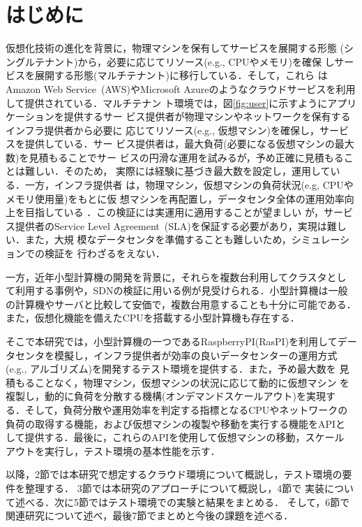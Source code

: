 \documentclass[submit,techrep]{ipsj}
\begin{document}
\section{はじめに}
仮想化技術の進化を背景に，物理マシンを保有してサービスを展開する形態
(シングルテナント)から，必要に応じてリソース(e.g., CPUやメモリ)を確保
しサービスを展開する形態(マルチテナント)に移行している．そして，これら
はAmazon Web Service~(AWS)\cite{aws}やMicrosoft Azure\cite{azure}のようなクラウドサービスを利用して提供されている．マルチテナン
ト環境では，図\ref{fig:user}に示すようにアプリケーションを提供するサー
ビス提供者が物理マシンやネットワークを保有するインフラ提供者から必要に
応じてリソース(e.g., 仮想マシン)を確保し，サービスを提供している．サー
ビス提供者は，最大負荷(必要になる仮想マシンの最大数)を見積もることでサー
ビスの円滑な運用を試みるが，予め正確に見積もることは難しい．そのため，
実際には経験に基づき最大数を設定し，運用している．一方，インフラ提供者
は，物理マシン，仮想マシンの負荷状況(e.g, CPUやメモリ使用量)をもとに仮
想マシンを再配置し，データセンタ全体の運用効率向上を目指している
\cite{cloud1}\cite{cloud2}．この検証には実運用に適用することが望ましい
が，サービス提供者のService Level Agreement~(SLA)を保証する必要があり，実現は難しい．また，大規
模なデータセンタを準備することも難しいため，シミュレーションでの検証を
行わざるをえない\cite{testbed}．

一方，近年小型計算機の開発を背景に，それらを複数台利用してクラスタとし
て利用する事例や，SDNの検証に用いる例が見受けられる．小型計算機は一般
の計算機やサーバと比較して安価で，複数台用意することも十分に可能である．
また，仮想化機能を備えたCPUを搭載する小型計算機も存在する．

そこで本研究では，小型計算機の一つであるRaspberryPI(RasPI)を利用してデー
タセンタを模擬し，インフラ提供者が効率の良いデータセンターの運用方式
(e.g., アルゴリズム)を開発するテスト環境を提供する．また，予め最大数を
見積もることなく，物理マシン，仮想マシンの状況に応じて動的に仮想マシン
を複製し，動的に負荷を分散する機構(オンデマンドスケールアウト)を実現す
る．そして，負荷分散や運用効率を判定する指標となるCPUやネットワークの
負荷の取得する機能，および仮想マシンの複製や移動を実行する機能をAPIと
して提供する．最後に，これらのAPIを使用して仮想マシンの移動，スケール
アウトを実行し，テスト環境の基本性能を示す．

以降，2節では本研究で想定するクラウド環境について概説し，テスト環境の要件を整理する．
3節では本研究のアプローチについて概説し，4節で
実装について述べる．次に5節ではテスト環境での実験と結果をまとめる．
そして，6節で関連研究について述べ，最後7節でまとめと今後の課題を述べる．
\end{document}
